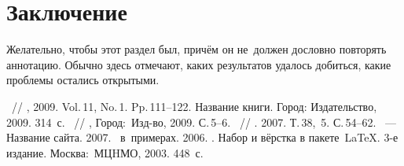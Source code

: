 \documentclass[12pt,twoside]{article}
\begin{document}
    \section{Заключение}
    Желательно, чтобы этот раздел был, причём он не~должен дословно повторять аннотацию.
    Обычно здесь отмечают,
    каких результатов удалось добиться,
    какие проблемы остались открытыми.
    
    
    
    
    \begin{thebibliography}{1}
    
       ~//
       , 2009.  Vol.\,11, No.\,1.  Pp.\,111--122.
       Название книги.       Город: Издательство, 2009. 314~с.
       ~//
       ,
       Город:~Изд-во, 2009.  С.\,5--6.
       ~//
       . 2007. Т.\,38, \No\,5. С.\,54--62.
       ~---
       Название сайта.  2007.
       \LaTeXe\ в~примерах.
       2006.
       .
        Набор и вёрстка в пакете~\LaTeX.
       3-е издание.
       Москва:~МЦHМО, 2003.  448~с.
    \end{thebibliography}
    
    
\end{document}
